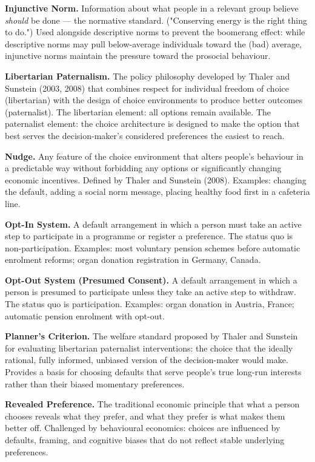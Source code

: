 \documentclass[12pt, letterpaper]{article}
\begin{document}
\textbf{Injunctive Norm.} Information about what people in a relevant group believe \textit{should} be done --- the normative standard. ("Conserving energy is the right thing to do.") Used alongside descriptive norms to prevent the boomerang effect: while descriptive norms may pull below-average individuals toward the (bad) average, injunctive norms maintain the pressure toward the prosocial behaviour.

\textbf{Libertarian Paternalism.} The policy philosophy developed by Thaler and Sunstein (2003, 2008) that combines respect for individual freedom of choice (libertarian) with the design of choice environments to produce better outcomes (paternalist). The libertarian element: all options remain available. The paternalist element: the choice architecture is designed to make the option that best serves the decision-maker's considered preferences the easiest to reach.

\textbf{Nudge.} Any feature of the choice environment that alters people's behaviour in a predictable way without forbidding any options or significantly changing economic incentives. Defined by Thaler and Sunstein (2008). Examples: changing the default, adding a social norm message, placing healthy food first in a cafeteria line.

\textbf{Opt-In System.} A default arrangement in which a person must take an active step to participate in a programme or register a preference. The status quo is non-participation. Examples: most voluntary pension schemes before automatic enrolment reforms; organ donation registration in Germany, Canada.

\textbf{Opt-Out System (Presumed Consent).} A default arrangement in which a person is presumed to participate unless they take an active step to withdraw. The status quo is participation. Examples: organ donation in Austria, France; automatic pension enrolment with opt-out.

\textbf{Planner's Criterion.} The welfare standard proposed by Thaler and Sunstein for evaluating libertarian paternalist interventions: the choice that the ideally rational, fully informed, unbiased version of the decision-maker would make. Provides a basis for choosing defaults that serve people's true long-run interests rather than their biased momentary preferences.

\textbf{Revealed Preference.} The traditional economic principle that what a person chooses reveals what they prefer, and what they prefer is what makes them better off. Challenged by behavioural economics: choices are influenced by defaults, framing, and cognitive biases that do not reflect stable underlying preferences.
\end{document}
